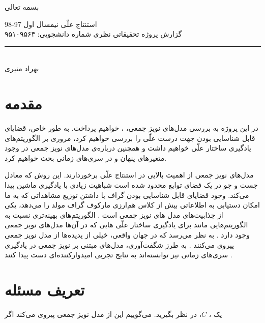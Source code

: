 \documentclass[a4paper,12pt]{article}
\begin{document}
\begin{center}
بسمه تعالی
\end{center}
\begin{large}
استنتاج علّی
\hspace{10.3cm}
نیمسال اول 97-98
\\
گزارش پروژه تحقیقاتی نظری\hspace{8cm}  شماره دانشجویی:  ۹۵۱۰۹۵۶۴
\end{large}

\noindent\rule{\textwidth}{1pt}
\begin{center}
\begin{large}
\textbf{}\\
\vspace{0.5cm}
بهراد منیری
\end{large}
\end{center}


\section{مقدمه}
در این پروژه به بررسی مدل‌های نویز جمعی،
،
خواهیم پرداخت. به طور خاص، قضایای قابل شناسایی بودن جهت درست علّی  را بررسی خواهیم کرد، مروری بر الگوریتم‌های یادگیری  ساختار‌ علّی خواهیم داشت و همچنین درباره‌ی مدل‌های نویز جمعی در وجود متغیر‌های پنهان و در سری‌های زمانی بحث خواهیم کرد. 

مدل‌های نویز جمعی از اهمیت بالایی در استنتاج علّی برخوردارند.  این روش که معادل جست‌ و جو در یک فضای توابع محدود شده است شباهیت زیادی با یادگیری ماشین پیدا می‌کند. وجود  قضایای قابل شناسایی بودن گراف  با داشتن توزیع مشاهداتی که به ما امکان دستیابی به اطلاعاتی بیش از کلاس هم‌ارزی مارکوف گراف مولد را می‌دهد، یکی از جذابیت‌های مدل های نویز جمعی است
\cite{hoyer}.
الگوریتم‌های بهینه‌تری نسبت به الگوریتم‌هایی مانند 
برای یادگیری ساختار علّی 
هایی که در آن‌ها مدل‌های نویز جمعی وجود دارد 
\cite{continous}.
به نظر می‌رسد که در جهان واقعی، خیلی از پدیده‌ها از مدل‌ نویز جمعی پیروی می‌کنند
\cite{continous, postnonlinear}.
 به طرز شگفت‌آوری، مدل‌های مبتنی بر نویز جمعی در یادگیری سری‌های زمانی نیز توانسته‌اند به نتایج تجربی امیدوارکننده‌ای دست پیدا کنند
\cite{time}.


\section{تعریف مسئله}

یک 
،
$C$،
در نظر بگیرید. می‌گوییم این 
از مدل نویز جمعی پیروی می‌کند اگر
	
\end{document}
